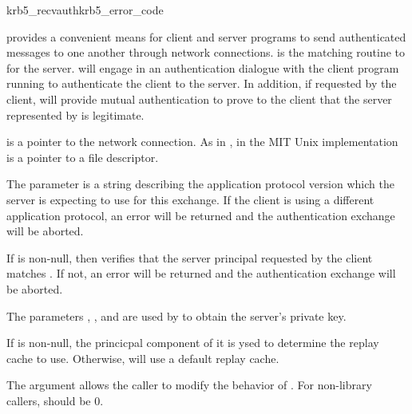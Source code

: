\begin{funcdecl}{krb5_recvauth}{krb5_error_code}{\funcinout}
\funcin
{}
\funcout
{}
\end{funcdecl}

 provides a convenient means for client and
server programs to send authenticated messages to one another through
network connections.   is the matching routine
to  for the server.  
will engage in an authentication dialogue with the
client program running  to authenticate the
client to the server.  In addition, if requested by the client,
 will provide mutual authentication to
prove to the client that the server represented by
 is legitimate. 

 is a pointer to the network connection.  As in
, in the MIT Unix implementation
 is a pointer to a file descriptor.

The parameter  is a string describing the
application protocol version which the server is expecting to use for
this exchange.  If the client is using a different application protocol,
an error will be returned and the authentication exchange will be
aborted.

If  is non-null, then 
verifies that the server principal requested by the client matches
.  If not, an error will be returned and the
authentication exchange will be aborted.

The parameters , ,
and  are used by  to obtain the
server's private key.

If  is non-null, the princicpal component of it is
ysed to determine the replay cache to use. Otherwise,
 will use a default replay cache.

The  argument allows the caller to modify the behavior of
.  For non-library callers, 
should be 0. 


